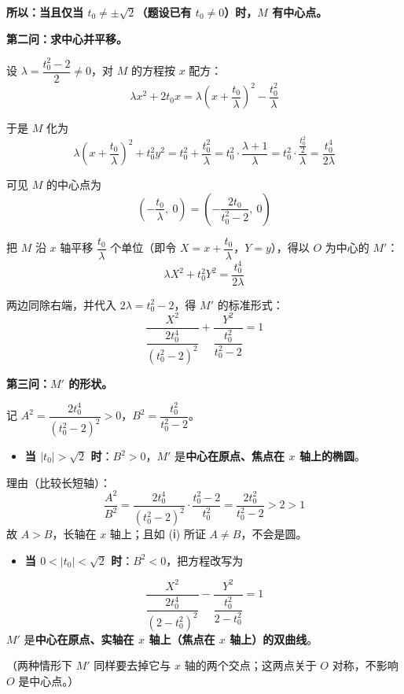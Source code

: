 \textbf{所以：当且仅当 $t_0\ne\pm\sqrt2$（题设已有 $t_0\ne0$）时，$M$ 有中心点。}

\textbf{第二问：求中心并平移。}

设 $\lambda=\dfrac{t_0^2-2}{2}\ne0$，对 $M$ 的方程按 $x$ 配方：
\[\lambda x^2+2t_0x=\lambda\left(x+\frac{t_0}{\lambda}\right)^2-\frac{t_0^2}{\lambda}\]

于是 $M$ 化为
\[\lambda\left(x+\frac{t_0}{\lambda}\right)^2+t_0^2y^2=t_0^2+\frac{t_0^2}{\lambda}=t_0^2\cdot\frac{\lambda+1}{\lambda}=t_0^2\cdot\frac{\frac{t_0^2}{2}}{\lambda}=\frac{t_0^4}{2\lambda}\]

可见 $M$ 的中心点为
\[\left(-\frac{t_0}{\lambda},\ 0\right)=\left(-\frac{2t_0}{t_0^2-2},\ 0\right)\]

把 $M$ 沿 $x$ 轴平移 $\dfrac{t_0}{\lambda}$ 个单位（即令 $X=x+\dfrac{t_0}{\lambda}$，$Y=y$），得以 $O$ 为中心的 $M'$：
\[\lambda X^2+t_0^2Y^2=\frac{t_0^4}{2\lambda}\]

两边同除右端，并代入 $2\lambda=t_0^2-2$，得 $M'$ 的标准形式：
\[\boxed{\frac{X^2}{\dfrac{2t_0^4}{\left(t_0^2-2\right)^2}}+\frac{Y^2}{\dfrac{t_0^2}{t_0^2-2}}=1}\]

\textbf{第三问：$M'$ 的形状。}

记 $A^2=\dfrac{2t_0^4}{\left(t_0^2-2\right)^2}>0$，$B^2=\dfrac{t_0^2}{t_0^2-2}$。

\begin{itemize}
\item \textbf{当 $\left|t_0\right|>\sqrt2$ 时}：$B^2>0$，$M'$ 是\textbf{中心在原点、焦点在 $x$ 轴上的椭圆}。
\end{itemize}
  理由（比较长短轴）：
\[\frac{A^2}{B^2}=\frac{2t_0^4}{\left(t_0^2-2\right)^2}\cdot\frac{t_0^2-2}{t_0^2}=\frac{2t_0^2}{t_0^2-2}>2>1\]
  故 $A>B$，长轴在 $x$ 轴上；且如 (ⅰ) 所证 $A\ne B$，不会是圆。
\begin{itemize}
\item \textbf{当 $0<\left|t_0\right|<\sqrt2$ 时}：$B^2<0$，把方程改写为
\end{itemize}
\[\frac{X^2}{\dfrac{2t_0^4}{\left(2-t_0^2\right)^2}}-\frac{Y^2}{\dfrac{t_0^2}{2-t_0^2}}=1\]
  $M'$ 是\textbf{中心在原点、实轴在 $x$ 轴上（焦点在 $x$ 轴上）的双曲线}。

（两种情形下 $M'$ 同样要去掉它与 $x$ 轴的两个交点；这两点关于 $O$ 对称，不影响 $O$ 是中心点。）

